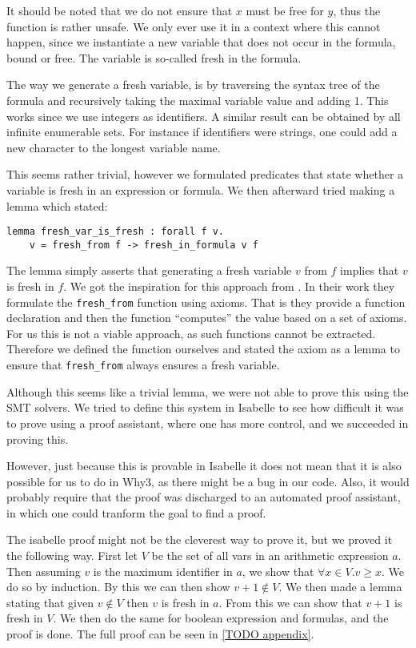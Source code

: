 It should be noted that we do not ensure that $x$ must be free for $y$,
thus the function is rather unsafe.
We only ever use it in a context where this cannot happen, since we instantiate a new variable that does not occur in the formula, bound or free. The variable is so-called fresh in the formula.

The way we generate a fresh variable, is by traversing the syntax tree of the formula and recursively taking the maximal variable value and adding 1.
This works since we use integers as identifiers.
A similar result can be obtained by all infinite enumerable sets. For instance if identifiers were strings, one could add a new character to the longest variable name.

This seems rather trivial, however we formulated predicates that state whether a variable is fresh in an expression or formula. We then afterward tried making a lemma which stated:

\begin{lstlisting}
lemma fresh_var_is_fresh : forall f v.
    v = fresh_from f -> fresh_in_formula v f
\end{lstlisting}

The lemma simply asserts that generating a fresh variable $v$ from $f$ implies that $v$ is fresh in $f$.
We got the inspiration for this approach from \cite{wp-revisited}.
In their work they formulate the \texttt{fresh\_from} function using axioms.
That is they provide a function declaration and then the function ``computes'' the value based on a set of axioms.
For us this is not a viable approach, as such functions cannot be extracted.
Therefore we defined the function ourselves and stated the axiom as a lemma to ensure that \texttt{fresh\_from} always ensures a fresh variable.

Although this seems like a trivial lemma, we were not able to prove this using the SMT solvers.
We tried to define this system in Isabelle to see how difficult it was to prove using a proof assistant, where one has more control, and we succeeded in proving this.

However, just because this is provable in Isabelle it does not mean that it is also possible
for us to do in Why3, as there might be a bug in our code.
Also, it would probably require that the proof was discharged to an automated proof assistant, in which one could tranform the goal to find a proof.

The isabelle proof might not be the cleverest way to prove it, but we proved it the following way.
First let $V$ be the set of all vars in an arithmetic expression $a$.
Then assuming $v$ is the maximum identifier in $a$, we show that $\forall x \in V. v \geq x$. We do so by induction.
By this we can then show $v + 1 \notin V$.
We then made a lemma stating that given $v \notin V$ then $v$ is fresh in $a$.
From this we can show that $v + 1$ is fresh in $V$.
We then do the same for boolean expression and formulas, and the proof is done.
The full proof can be seen in \autoref{TODO appendix}.
